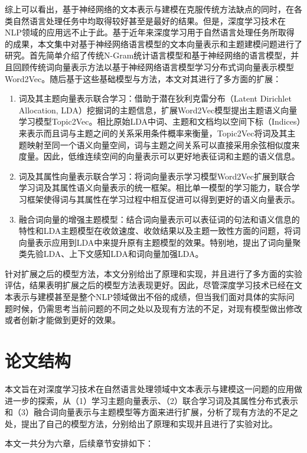 \documentclass[master]{njuthesis}
\begin{document}
综上可以看出，基于神经网络的文本表示与建模在克服传统方法缺点的同时，在各类自然语言处理任务中均取得较好甚至是最好的结果。但是，深度学习技术在NLP领域的应用远不止于此。基于近年来深度学习用于自然语言处理任务所取得的成果，本文集中对基于神经网络语言模型的文本向量表示和主题建模问题进行了研究。首先简单介绍了传统N-Gram统计语言模型和基于神经网络的语言模型，并且回顾传统词向量表示方法以基于神经网络语言模型学习分布式词向量表示模型Word2Vec。随后基于这些基础模型与方法，本文对其进行了多方面的扩展：

\begin{enumerate}
\item 词及其主题向量表示联合学习：借助于潜在狄利克雷分布（Latent Dirichlet Allocation, LDA）挖掘词的主题信息，扩展Word2Vec模型提出主题语义向量学习模型Topic2Vec。相比原始LDA中词、主题和文档均以空间下标（Indices）来表示而且词与主题之间的关系采用条件概率来衡量，Topic2Vec将词及其主题映射至同一个语义向量空间，词与主题之间关系可以直接采用余弦相似度来度量。因此，低维连续空间的向量表示可以更好地表征词和主题的语义信息。
\item 词及其属性向量表示联合学习：将词向量表示学习模型Word2Vec扩展到联合学习词及其属性语义向量表示的统一框架。相比单一模型的学习能力，联合学习框架使得词与其属性在学习过程中相互促进可以得到更好的语义向量表示。
\item 融合词向量的增强主题模型：结合词向量表示可以表征词的句法和语义信息的特性和LDA主题模型在收敛速度、收敛结果以及主题一致性方面的问题，将词向量表示应用到LDA中来提升原有主题模型的效果。特别地，提出了词向量聚类先验LDA、上下文感知LDA和词向量加强LDA。
\end{enumerate}
针对扩展之后的模型方法，本文分别给出了原理和实现，并且进行了多方面的实验评估，结果表明扩展之后的模型方法表现更好。因此，尽管深度学习技术已经在文本表示与建模甚至是整个NLP领域做出不俗的成绩，但当我们面对具体的实际问题时候，仍需思考当前问题的不同之处以及现有方法的不足，对现有模型做出修改或者创新才能做到更好的效果。

\section{论文结构}\label{sec_chap1_outline}

本文旨在对深度学习技术在自然语言处理领域中文本表示与建模这一问题的应用做进一步的探索，从（1）学习主题向量表示、（2）联合学习词及其属性分布式表示和（3）融合词向量表示与主题模型等方面来进行扩展，分析了现有方法的不足之处，提出了自己的模型方法，分别给出了原理和实现并且进行了实验对比。

本文一共分为六章，后续章节安排如下：
\end{document}
